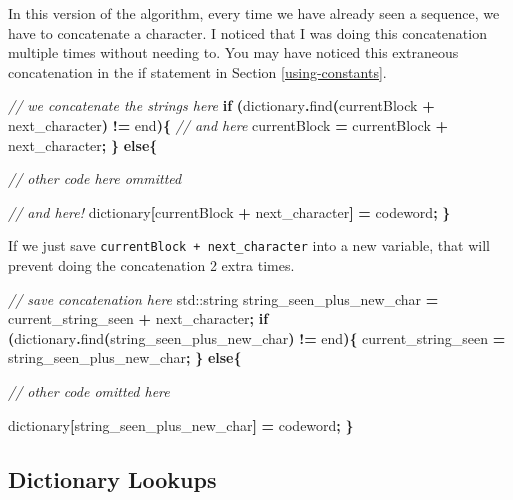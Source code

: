 \documentclass[12pt,twoside]{reedthesis}
\newenvironment{Shaded}{\begin{snugshade}}{\end{snugshade}}
\newcommand{\BuiltInTok}[1]{#1}
\newcommand{\CommentTok}[1]{\textcolor[rgb]{0.56,0.35,0.01}{\textit{#1}}}
\newcommand{\ControlFlowTok}[1]{\textcolor[rgb]{0.13,0.29,0.53}{\textbf{#1}}}
\newcommand{\NormalTok}[1]{#1}
\newcommand{\OperatorTok}[1]{\textcolor[rgb]{0.81,0.36,0.00}{\textbf{#1}}}
\begin{document}
In this version of the algorithm, every time we have already seen a sequence, we have to concatenate a character. I noticed that I was doing this concatenation multiple times without needing to. You may have noticed this extraneous concatenation in the if statement in Section \ref{using-constants}.
\begin{Shaded}
\begin{Highlighting}[]
\CommentTok{// we concatenate the strings here}
\ControlFlowTok{if} \OperatorTok{(}\NormalTok{dictionary}\OperatorTok{.}\NormalTok{find}\OperatorTok{(}\NormalTok{currentBlock }\OperatorTok{+}\NormalTok{ next\_character}\OperatorTok{)} \OperatorTok{!=}\NormalTok{ end}\OperatorTok{)\{}
    \CommentTok{// and here}
\NormalTok{    currentBlock }\OperatorTok{=}\NormalTok{ currentBlock }\OperatorTok{+}\NormalTok{ next\_character}\OperatorTok{;}
\OperatorTok{\}}
\ControlFlowTok{else}\OperatorTok{\{}

    \CommentTok{// other code here ommitted}


    \CommentTok{// and here! }
\NormalTok{    dictionary}\OperatorTok{[}\NormalTok{currentBlock }\OperatorTok{+}\NormalTok{ next\_character}\OperatorTok{]} \OperatorTok{=}\NormalTok{ codeword}\OperatorTok{;}
\OperatorTok{\}}
\end{Highlighting}
\end{Shaded}
If we just save \texttt{currentBlock\ +\ next\_character} into a new variable, that will prevent doing the concatenation 2 extra times.
\begin{Shaded}
\begin{Highlighting}[]
\CommentTok{// save concatenation here}
\BuiltInTok{std::}\NormalTok{string}\OperatorTok{ }\NormalTok{string\_seen\_plus\_new\_char }\OperatorTok{=}\NormalTok{ current\_string\_seen }\OperatorTok{+}\NormalTok{ next\_character}\OperatorTok{;}
\ControlFlowTok{if} \OperatorTok{(}\NormalTok{dictionary}\OperatorTok{.}\NormalTok{find}\OperatorTok{(}\NormalTok{string\_seen\_plus\_new\_char}\OperatorTok{)} \OperatorTok{!=}\NormalTok{ end}\OperatorTok{)\{}
\NormalTok{    current\_string\_seen }\OperatorTok{=}\NormalTok{ string\_seen\_plus\_new\_char}\OperatorTok{;}
\OperatorTok{\}}
\ControlFlowTok{else}\OperatorTok{\{}

\CommentTok{// other code omitted here}

\NormalTok{    dictionary}\OperatorTok{[}\NormalTok{string\_seen\_plus\_new\_char}\OperatorTok{]} \OperatorTok{=}\NormalTok{ codeword}\OperatorTok{;}
\OperatorTok{\}}
\end{Highlighting}
\end{Shaded}
\hypertarget{dictionary-lookups}{%
\subsection{Dictionary Lookups}\label{dictionary-lookups}}
\end{document}
